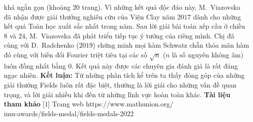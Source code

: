 \begin{multicols}{2}
khá ngắn gọn (khoảng $20$ trang). Vì những kết quả độc đáo này, M.~Viazovska đã nhận được giải thưởng nghiên cứu của Viện Clay năm $2017$ dành cho những kết quả Toán học xuất sắc nhất trong năm.        
	\vskip 0.05cm
	Sau lời giải bài toán xếp cầu ở chiều $8$ và $24$, M.~Viazovska đã phát triển tiếp tục ý tưởng của riêng mình. Chị đã cùng với D.~Radchenko ($2019$) chứng minh mọi hàm Schwatz chẵn thỏa mãn hàm đó cùng với biến đổi Fourier triệt tiêu tại các số $\sqrt{n}$ ($n$ là số nguyên không âm) luôn đồng nhất bằng $0$. Kết quả này được các chuyên gia đánh giá là rất đáng ngạc nhiên.
	\vskip 0.05cm
	{\bf\color{duongvaotoanhoc} Kết luận:}  Từ những phân tích kể trên ta thấy đóng góp của những giải thưởng Fields luôn rất đặc biệt, thường là lời giải cho những vấn đề quan trọng, và lời giải nhiều khi đến từ những lĩnh vực hoàn toàn khác.
	\vskip 0.05cm
	\textbf{\color{duongvaotoanhoc}Tài liệu tham khảo}
	\vskip 0.05cm
	[$1$] Trang web {\color{duongvaotoanhoc}https://www.mathunion.org/\\imu-awards/fields-medal/fields-medals-2022}
	\vskip 0.05cm
\end{multicols}